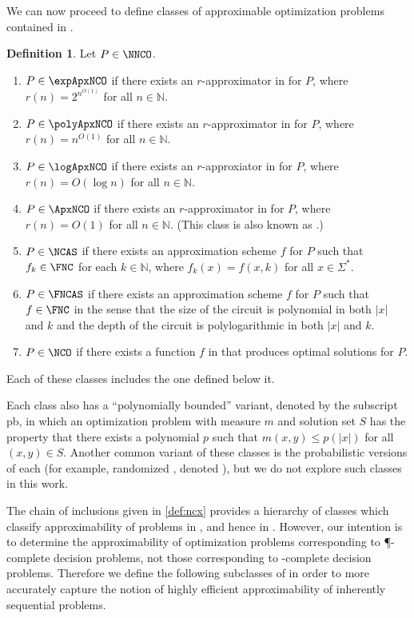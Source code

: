 \documentclass[]{article}
\theoremstyle{plain}
\theoremstyle{definition}
\newtheorem{definition}{Definition}
\newcommand{\pb}{\textsf{pb}}
\begin{document}
We can now proceed to define classes of approximable optimization problems contained in \NNCO.

\begin{definition}\label{def:ncx}
  Let $P\in\NNCO$.
  \begin{enumerate}
  \item $P\in\expApxNCO$ if there exists an $r$-approximator in \FNC{} for $P$, where $r(n)=2^{n^{O(1)}}$ for all $n\in\mathbb{N}$.
  \item $P\in\polyApxNCO$ if there exists an $r$-approximator in \FNC{} for $P$, where $r(n)=n^{O(1)}$ for all $n\in\mathbb{N}$.
  \item $P\in\logApxNCO$ if there exists an $r$-approxiator in \FNC{} for $P$, where $r(n)=O(\log n)$ for all $n\in\mathbb{N}$.
  \item $P\in\ApxNCO$ if there exists an $r$-approximator in \FNC{} for $P$, where $r(n)=O(1)$ for all $n\in\mathbb{N}$.
    (This class is also known as \NCX.)
  \item $P\in\NCAS$ if there exists an approximation scheme $f$ for $P$ such that $f_k\in\FNC$ for each $k\in\mathbb{N}$, where $f_k(x)=f(x, k)$ for all $x\in\Sigma^*$.
  \item $P\in\FNCAS$ if there exists an approximation scheme $f$ for $P$ such that $f\in\FNC$ in the sense that the size of the circuit is polynomial in both $|x|$ and $k$ and the depth of the circuit is polylogarithmic in both $|x|$ and $k$.
  \item $P\in\NCO$ if there exists a function $f$ in \FNC{} that produces optimal solutions for $P$.
  \end{enumerate}
\end{definition}

Each of these classes includes the one defined below it.

Each class also has a ``polynomially bounded'' variant, denoted by the subscript \pb, in which an optimization problem with measure $m$ and solution set $S$ has the property that there exists a polynomial $p$ such that $m(x, y) \leq p(|x|)$ for all $(x, y)\in S$.
Another common variant of these classes is the probabilistic versions of each (for example, randomized \NCAS{}, denoted \RNCAS), but we do not explore such classes in this work.

The chain of inclusions given in \autoref{def:ncx} provides a hierarchy of classes which classify approximability of problems in \NNCO{}, and hence in \NPO.
However, our intention is to determine the approximability of optimization problems corresponding to \P-complete decision problems, not those corresponding to \NP-complete decision problems.
Therefore we define the following subclasses of \PO{} in order to more accurately capture the notion of highly efficient approximability of inherently sequential problems.
\end{document}
